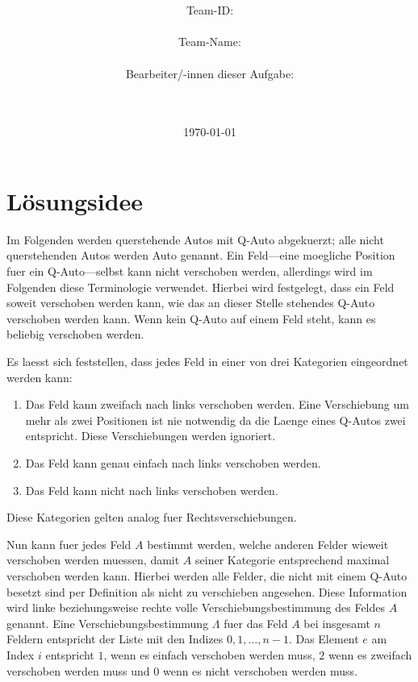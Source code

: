 \documentclass[a4paper,10pt,ngerman]{scrartcl}
\title{\textbf{\Huge\Aufgabe}}
\author{\LARGE Team-ID: \LARGE \TeamId \\\\
	    \LARGE Team-Name: \LARGE \TeamName \\\\
	    \LARGE Bearbeiter/-innen dieser Aufgabe: \\ 
	    \LARGE \Namen\\\\}
\date{\LARGE\today}
\begin{document}
\maketitle
\tableofcontents

\vspace{0.5cm}

\section{Lösungsidee}
Im Folgenden werden querstehende Autos mit \glqq{}Q-Auto\grqq{} abgekuerzt; alle nicht querstehenden Autos werden \glqq{}Auto\grqq{} genannt.
Ein Feld---eine moegliche Position fuer ein Q-Auto---selbst kann nicht verschoben werden, allerdings wird im Folgenden diese Terminologie verwendet.
Hierbei wird festgelegt, dass ein Feld soweit verschoben werden kann, wie das an dieser Stelle stehendes Q-Auto verschoben werden kann.
Wenn kein Q-Auto auf einem Feld steht, kann es beliebig verschoben werden.

Es laesst sich feststellen, dass jedes Feld in einer von drei Kategorien eingeordnet werden kann:
\begin{enumerate}
    \item Das Feld kann zweifach nach links verschoben werden.
          Eine Verschiebung um mehr als zwei Positionen ist nie notwendig da die Laenge eines Q-Autos zwei entspricht.
          Diese Verschiebungen werden ignoriert.
    \item Das Feld kann genau einfach nach links verschoben werden.
    \item Das Feld kann nicht nach links verschoben werden.
\end{enumerate}
Diese Kategorien gelten analog fuer Rechtsverschiebungen.

Nun kann fuer jedes Feld $A$ bestimmt werden, welche anderen Felder wieweit verschoben werden muessen, damit $A$ seiner Kategorie entsprechend maximal verschoben werden kann.
Hierbei werden alle Felder, die nicht mit einem Q-Auto besetzt sind per Definition als nicht zu verschieben angesehen.
Diese Information wird linke beziehungsweise rechte volle Verschiebungsbestimmung des Feldes $A$ genannt.
Eine Verschiebungsbestimmung $\Lambda$ fuer das Feld $A$ bei insgesamt $n$ Feldern entspricht der Liste mit den Indizes $0,1,\dots,n-1$.
Das Element $e$ am Index $i$ entspricht $1$, wenn es einfach verschoben werden muss, $2$ wenn es zweifach verschoben werden muss und $0$ wenn es nicht verschoben werden muss.
\end{document}
